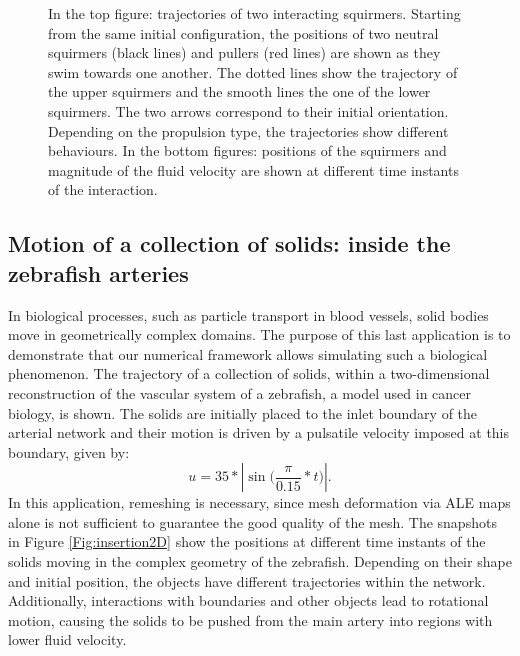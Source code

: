 \documentclass[graybox]{svmult}
\begin{document}
\begin{figure}
	\caption{In the top figure: trajectories of two interacting squirmers. Starting from the same initial configuration, the positions of two neutral squirmers (black lines) and pullers (red lines) are shown as they swim towards one another. The dotted lines show the trajectory of the upper squirmers and the smooth lines the one of the lower squirmers. The two arrows correspond to their initial orientation. Depending on the propulsion type, the trajectories show different behaviours.
 In the bottom figures: positions of the squirmers and magnitude of the fluid velocity are shown at different time instants of the interaction.}
	\label{Fig:squirmers}
\end{figure}


\subsection{Motion of a collection of solids: inside the zebrafish arteries}

\color{black}
In biological processes, such as particle transport in blood vessels, solid bodies move in geometrically complex domains. The purpose of this last application is to demonstrate that our numerical framework allows simulating such a biological phenomenon. The trajectory of a collection of solids, within a two-dimensional reconstruction of the vascular system of a zebrafish, a model used in cancer biology, is shown. 
\color{black}
The solids are initially placed to the inlet boundary of the arterial network and their motion is driven by a pulsatile velocity imposed at this boundary, given by:  
$$
u = 35 * |\sin \bigl( \frac{\pi}{0.15}*t \bigr) |.
$$ 
In this application, remeshing %
is necessary, since mesh deformation via ALE maps alone is not sufficient to guarantee the good quality of the mesh.
The snapshots in Figure \ref{Fig:insertion2D} show the positions at different time instants of the solids moving in the complex geometry of the zebrafish. Depending on their shape and initial position, the objects have different trajectories within the network. Additionally, interactions with boundaries and other objects lead to rotational motion, causing the solids to be pushed from the main artery into regions with lower fluid velocity.


\end{document}
